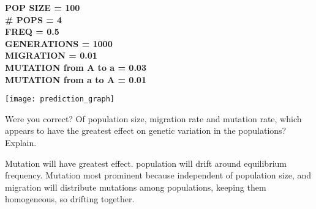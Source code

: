 \documentclass[11pt, addpoints]{exam}
\begin{document}
\begin{questions}
\ifprintanswers
	{\bfseries %
	POP SIZE = 100\\
	\# POPS = 4\\
	FREQ = 0.5\\
	GENERATIONS = 1000\\
	MIGRATION = 0.01 \\
	MUTATION from A to a = 0.03\\
	MUTATION from a to A = 0.01}\vspace*{14\baselineskip}
\else
	\begin{center}
		\texttt{[image: prediction\_graph]}
	\end{center}
\fi

\question[1]
Were you correct? Of population size, migration rate and
mutation rate, which appears to have the greatest effect on genetic
variation in the populations? Explain.

\begin{solution}
Mutation will have greatest effect. population will drift around equilibrium frequency. Mutation most prominent because independent of population size, and migration will distribute mutations among populations, keeping them homogeneous, so drifting together.
\end{solution}
\end{questions}
\end{document}
